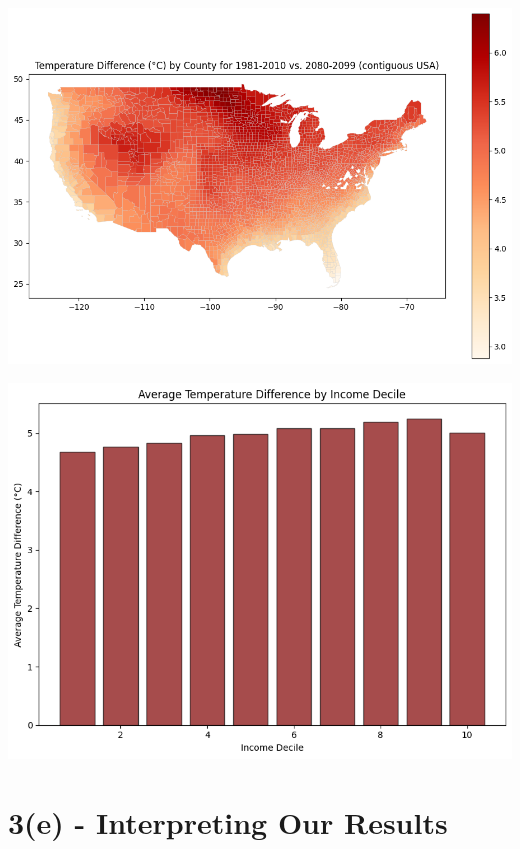 \documentclass[
  letterpaper,
  DIV=11,
  numbers=noendperiod]{scrartcl}
\begin{document}
\includegraphics{Assignment-1_ICP_files/figure-pdf/cell-10-output-1.png}

\includegraphics{Assignment-1_ICP_files/figure-pdf/cell-10-output-2.png}

\section{3(e) - Interpreting Our
Results}\label{e---interpreting-our-results}
\end{document}
